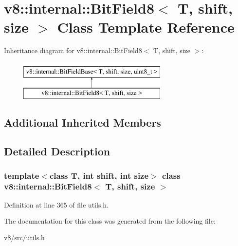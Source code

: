 \hypertarget{classv8_1_1internal_1_1BitField8}{}\section{v8\+:\+:internal\+:\+:Bit\+Field8$<$ T, shift, size $>$ Class Template Reference}
\label{classv8_1_1internal_1_1BitField8}
Inheritance diagram for v8\+:\+:internal\+:\+:Bit\+Field8$<$ T, shift, size $>$\+:\begin{figure}[H]
\begin{center}
\leavevmode
\includegraphics[height=2.000000cm]{classv8_1_1internal_1_1BitField8}
\end{center}
\end{figure}
\subsection*{Additional Inherited Members}


\subsection{Detailed Description}
\subsubsection*{template$<$class T, int shift, int size$>$\newline
class v8\+::internal\+::\+Bit\+Field8$<$ T, shift, size $>$}



Definition at line 365 of file utils.\+h.



The documentation for this class was generated from the following file\+:\begin{DoxyCompactItemize}
\item 
v8/src/utils.\+h\end{DoxyCompactItemize}
